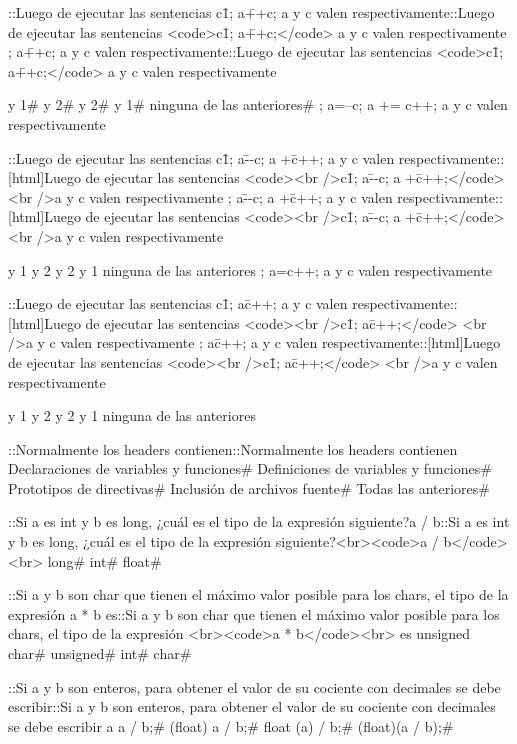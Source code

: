 {{{{{{{{{{{\question ::Luego de ejecutar las sentencias c\=1; a\=++c; a y c valen respectivamente::Luego de ejecutar las sentencias <code>c\=1; a\=++c;</code> a y c valen respectivamente
; a\=++c; a y c valen respectivamente::Luego de ejecutar las sentencias <code>c\=1; a\=++c;</code> a y c valen respectivamente{
 y 1# 
 y 2# 
 y 2# 
 y 1# 
\choice ninguna de las anteriores# 
; a=--c; a += c++; a y c valen respectivamente 

\question ::Luego de ejecutar las sentencias c\=1; a\=--c; a +\= c++; a y c valen respectivamente::[html]Luego de ejecutar las sentencias <code><br />c\=1; a\=--c; a +\= c++;</code> <br />a y c valen respectivamente
; a\=--c; a +\= c++; a y c valen respectivamente::[html]Luego de ejecutar las sentencias <code><br />c\=1; a\=--c; a +\= c++;</code> <br />a y c valen respectivamente{
 y 1
 y 2
 y 2
 y 1
\correctchoice ninguna de las anteriores
; a=c++; a y c valen respectivamente 

\question ::Luego de ejecutar las sentencias c\=1; a\=c++; a y c valen respectivamente::[html]Luego de ejecutar las sentencias <code><br />c\=1; a\=c++;</code> <br />a y c valen respectivamente
; a\=c++; a y c valen respectivamente::[html]Luego de ejecutar las sentencias <code><br />c\=1; a\=c++;</code> <br />a y c valen respectivamente{
 y 1
 y 2
 y 2
 y 1
\choice ninguna de las anteriores

\question ::Normalmente los headers contienen::Normalmente los headers contienen
\correctchoice Declaraciones de variables y funciones# 
\choice Definiciones de variables y funciones# 
\choice Prototipos de directivas# 
\choice Inclusión de archivos fuente# 
\choice Todas las anteriores# 

\question ::Si a es int y b es long, ¿cuál es el tipo de la expresión siguiente?a / b::Si a es int y b es long, ¿cuál es el tipo de la expresión siguiente?<br><code>a / b</code><br>
\correctchoice long# 
\choice int# 
\choice float# 

\question ::Si a y b son char que tienen el máximo valor posible para los chars, el tipo de la expresión a * b es\:::Si a y b son char que tienen el máximo valor posible para los chars, el tipo de la expresión <br><code>a * b</code><br> es\:
\choice unsigned char# 
\choice unsigned# 
\choice int# 
\correctchoice char# 

\question ::Si a y b son enteros, para obtener el valor de su cociente con decimales se debe escribir::Si a y b son enteros, para obtener el valor de su cociente con decimales se debe escribir
\choice a %
\choice a / b;# 
\correctchoice (float) a / b;# 
\choice float (a) / b;# 
\choice (float)(a / b);# 

}}}}}}}}}}}}}}
